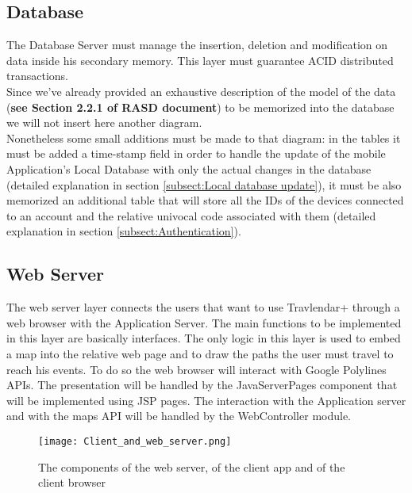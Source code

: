 \subsection{Database}
\label{subsect:Database}
	The Database Server must manage the insertion, deletion and modification on data inside his secondary memory. This layer must guarantee ACID distributed transactions.\\
	Since we've already provided an exhaustive description of the model of the data (\textbf{see Section 2.2.1 of RASD document}) to be memorized into the database we will not insert here another diagram.\\
	Nonetheless some small additions must be made to that diagram: in the tables it must be added a time-stamp field in order to handle the update of the mobile Application's Local Database with only the actual changes in the database (detailed explanation in section \ref{subsect:Local database update}), it must be also memorized an additional table that will store all the IDs of the devices connected to an account and the relative univocal code associated with them (detailed explanation in section \ref{subsect:Authentication}).	

\subsection{Web Server}
\label{subsect:Web Server}
	The web server layer connects the users that want to use Travlendar+ through a web browser with the Application Server. \newline
	The main functions to be implemented in this layer are basically interfaces.
	The only logic in this layer is used to embed a map into the relative web page and to draw the paths the user must travel to reach his events. To do so the web browser will interact with Google Polylines APIs.\newline
	The presentation will be handled by the JavaServerPages component that will be implemented using JSP pages. The interaction with the Application server and with the maps API will be handled by the WebController module.
	
\begin{figure}[H]
\begin{center}
		\hspace*{-0pt}
		\texttt{[image: Client\_and\_web\_server.png]}
\end{center}
\caption{The components of the web server, of the client app and of the client browser}
\end{figure}

